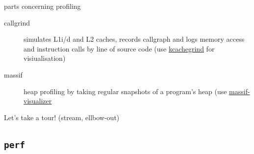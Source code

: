 \documentclass[9pt,xcolor=table]{beamer}
\begin{document}
\begin{frame}
\begin{block}{parts concerning profiling}
\begin{description}
    \item[callgrind]  simulates L1i/d and L2 caches, records callgraph and logs memory access and instruction calls by line of source code (use \href{http://kcachegrind.sourceforge.net/html/Home.html}{kcachegrind} for visiualisation)
    \item[massif] heap profiling by taking regular snapshots of a program's heap (use \href{https://gitorious.org/massif-visualizer}{massif-visualizer}
    \end{description}
    \pause
    \begin{center}
      \alert{Let's take a tour!} (stream, ellbow-out)
    \end{center}
  \end{block}
\end{frame}


\subsection{\texttt{perf}}
\end{document}
